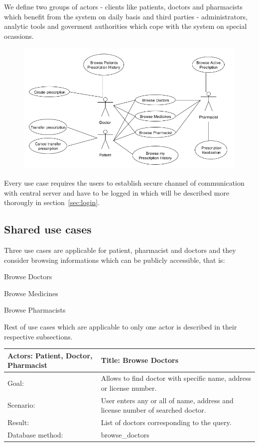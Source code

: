 
\chapter {}
We define two groups of actors - clients like patients, doctors and pharmacists which benefit from the system on daily basis and third parties - administrators, analytic tools and goverment authorities which cope with the system on special ocassions.

\begin{figure}[h]
\centering
\includegraphics[width=1\textwidth]{database/standardUseCases.png}
\end{figure} 

Every use case requires the users to establish secure channel of communication with central server and have to be logged in which will be described more thorougly in section~\ref{sec:login}.
\section{Shared use cases}

Three use cases are applicable for patient, pharmacist and doctors and they consider browsing informations which can be publicly accessible, that is:
\begin{packed_enum}
\item Browse Doctors
\item Browse Medicines 
\item Browse Pharmacists
\end{packed_enum}
Rest of use cases which are applicable to only one actor is described in their respective subsections.
\small
\begin{longtable}{|p{6cm}|p{7.75cm}|}
   
    \hline
    Actors: Patient, Doctor, Pharmacist &Title: Browse Doctors \\ \hline
    Goal: & Allows to find doctor with specific name, address or license number. \\ \hline
    Scenario: & User enters any or all of name, address and license number of searched doctor. \\ \hline
    Result: & List of doctors corresponding to the query. \\ \hline
    Database  method: & browse\_doctors \\ \hline
    
\end{longtable}

